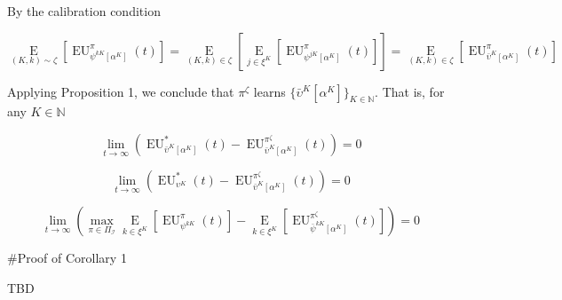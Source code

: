 \documentclass[a4paper]{article}
\newcommand{\E}[1]{\underset{#1}{\operatorname{E}}}
\newcommand{\Nats}{\mathbb{N}}
\newcommand{\I}{\mathcal{I}}
\newcommand{\EU}{\operatorname{EU}}
\begin{document}
By the calibration condition

$$\E{(K,k)\sim\zeta}[\EU_{\psi^{kK}[\alpha^K]}^\pi(t)] = \E{(K,k) \in \zeta}[\E{j \in \xi^K}[\EU_{\psi^{jK}[\alpha^K]}^\pi(t)]]=\E{(K,k) \in \zeta}[\EU_{\bar{\upsilon}^K[\alpha^K]}^\pi(t)]$$

Applying Proposition 1, we conclude that $\pi^\zeta$ learns $\{\bar{\upsilon}^K[\alpha^K]\}_{K \in \Nats}$. That is, for any $K \in \Nats$

$$\lim_{t \rightarrow \infty} (\EU_{\bar{\upsilon}^K[\alpha^K]}^*(t)-\EU_{\bar{\upsilon}^K[\alpha^K]}^{\pi^\zeta}(t)) = 0$$

$$\lim_{t \rightarrow \infty} (\EU_{\upsilon^K}^*(t)-\EU_{\bar{\upsilon}^K[\alpha^K]}^{\pi^\zeta}(t)) = 0$$

$$\lim_{t \rightarrow \infty} (\max_{\pi\in\Pi_{\I}} \E{k\in\xi^K}[\EU_{\psi^{kK}}^\pi(t)]-\E{k\in\xi^K}[\EU_{\bar{\psi}^{kK}[\alpha^K]}^{\pi^\zeta}(t)]) = 0$$

\#Proof of Corollary 1

TBD
\end{document}
